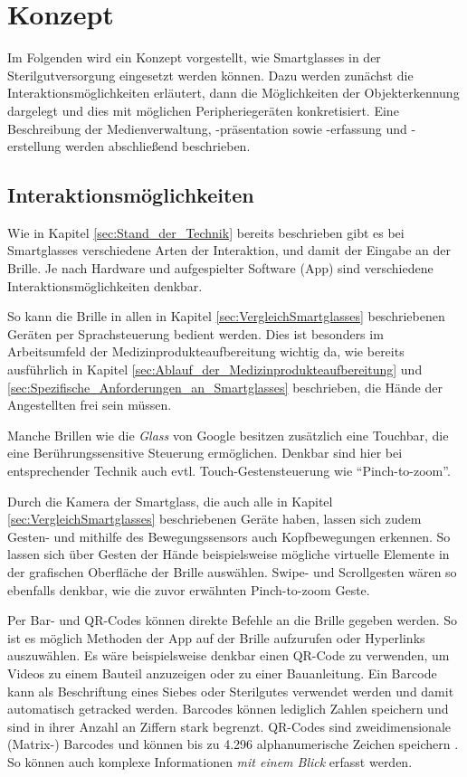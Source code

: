 %
%
%
%
%
%
\chapter{Konzept}
\label{ch:Konzept}
Im Folgenden wird ein Konzept vorgestellt, wie Smartglasses in der Sterilgutversorgung eingesetzt werden können. Dazu werden zunächst die Interaktionsmöglichkeiten erläutert, dann die Möglichkeiten der Objekterkennung dargelegt und dies mit möglichen Peripheriegeräten konkretisiert. Eine Beschreibung der Medienverwaltung, -präsentation sowie -erfassung und -erstellung werden abschließend beschrieben.
%
%
%
%
%
%
\section{Interaktionsmöglichkeiten}
\label{sec:Interaktionsmoeglichkeiten}
Wie in Kapitel \ref{sec:Stand_der_Technik} bereits beschrieben gibt es bei Smartglasses verschiedene Arten der Interaktion, und damit der Eingabe an der Brille. Je nach Hardware und aufgespielter Software (App) sind verschiedene Interaktionsmöglichkeiten denkbar. 

So kann die Brille in allen in Kapitel \ref{sec:VergleichSmartglasses} beschriebenen Geräten per Sprachsteuerung bedient werden. Dies ist besonders im Arbeitsumfeld der Medizinprodukteaufbereitung wichtig da, wie bereits ausführlich in Kapitel \ref{sec:Ablauf_der_Medizinprodukteaufbereitung} und \ref{sec:Spezifische_Anforderungen_an_Smartglasses} beschrieben, die Hände der Angestellten frei sein müssen.

Manche Brillen wie die \emph{Glass} von Google besitzen zusätzlich eine Touchbar, die eine Berührungssensitive Steuerung ermöglichen. Denkbar sind hier bei entsprechender Technik auch evtl. Touch-Gestensteuerung wie \enquote{Pinch-to-zoom}.

Durch die Kamera der Smartglass, die auch alle in Kapitel \ref{sec:VergleichSmartglasses} beschriebenen Geräte haben, lassen sich zudem Gesten- und mithilfe des Bewegungssensors auch Kopfbewegungen erkennen. So lassen sich über Gesten der Hände beispielsweise mögliche virtuelle Elemente in der grafischen Oberfläche der Brille auswählen. Swipe- und Scrollgesten wären so ebenfalls denkbar, wie die zuvor erwähnten Pinch-to-zoom Geste.

Per Bar- und QR-Codes können direkte Befehle an die Brille gegeben werden. So ist es möglich Methoden der App auf der Brille aufzurufen oder Hyperlinks auszuwählen. Es wäre beispielsweise denkbar einen QR-Code zu verwenden, um Videos zu einem Bauteil anzuzeigen oder zu einer Bauanleitung. Ein Barcode kann als Beschriftung eines Siebes oder Sterilgutes verwendet werden und damit automatisch getracked werden. Barcodes können lediglich Zahlen speichern und sind in ihrer Anzahl an Ziffern stark begrenzt. QR-Codes sind zweidimensionale (Matrix-) Barcodes und können bis zu 4.296 alphanumerische Zeichen speichern \cite{INCORPORATED2018}. So können auch komplexe Informationen \emph{mit einem Blick} erfasst werden.

